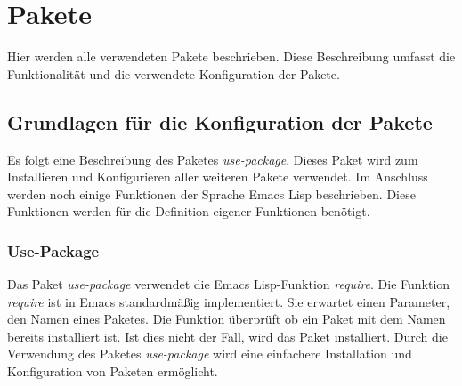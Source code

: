 \chapter{Pakete}
\label{cha:pakete}
Hier werden alle verwendeten Pakete beschrieben. Diese Beschreibung
umfasst die Funktionalität und die verwendete Konfiguration der
Pakete.\\

\section{Grundlagen für die Konfiguration der Pakete}
\label{sec:basicsKonfig}
Es folgt eine Beschreibung des Paketes \textit{use-package}. Dieses
Paket wird zum Installieren und Konfigurieren aller weiteren Pakete
verwendet. Im Anschluss werden noch einige Funktionen der Sprache
Emacs Lisp beschrieben. Diese Funktionen werden für die Definition
eigener Funktionen benötigt.\\

\subsection{Use-Package}
\label{subsec:usepackage}
Das Paket \textit{use-package} verwendet die Emacs Lisp-Funktion
\textit{require}. Die Funktion \textit{require} ist in Emacs
standardmäßig implementiert. Sie erwartet einen Parameter, den Namen
eines Paketes. Die Funktion überprüft ob ein Paket mit dem Namen
bereits installiert ist. Ist dies nicht der Fall, wird das Paket
installiert. Durch die Verwendung des Paketes \textit{use-package}
wird eine einfachere Installation und Konfiguration von Paketen
ermöglicht.

